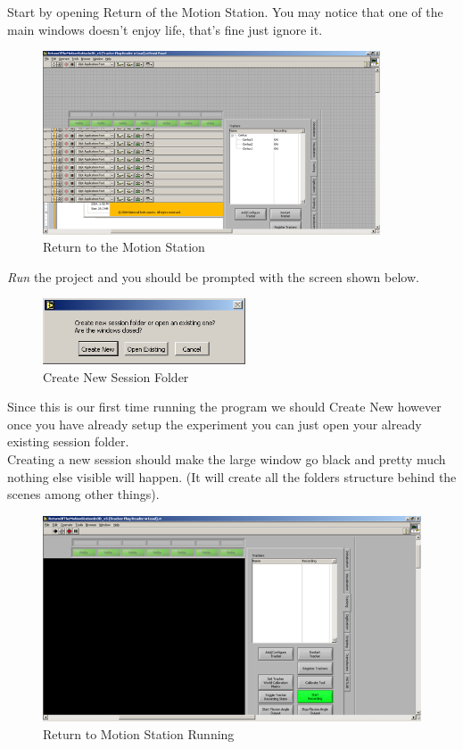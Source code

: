 \documentclass[pdftex,11pt,letterpaper]{article}
\begin{document}
Start by opening Return of the Motion Station. You may notice that one of the main windows doesn’t enjoy life, that’s fine just ignore it. 

\begin{figure}[ht!]
\centering
\includegraphics[width=100mm]{./images/rtms}
\caption{Return to the Motion Station}
\end{figure}

\textit{Run} the project and you should be prompted with the screen shown below.

\begin{figure}[ht!]
\centering
\includegraphics[width=60mm]{./images/create_new}
\caption{Create New Session Folder}
\end{figure}

Since this is our first time running the program we should Create New however once you have already setup the experiment you can just open your already existing session folder. \\

Creating a new session should make the large window go black and pretty much nothing else visible will happen. (It will create all the folders structure behind the scenes among other things). 

\begin{figure}[ht!]
\centering
\includegraphics[width=150mm]{./images/rtms2}
\caption{Return to Motion Station Running}
\end{figure}
\end{document}
